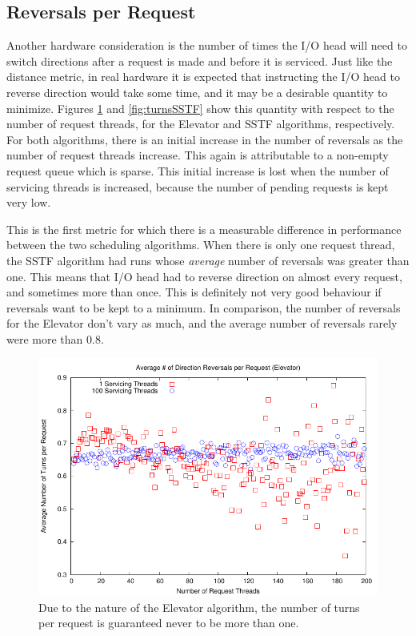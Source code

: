 \documentclass[12pt]{report}
\begin{document}
\subsection{Reversals per Request}
Another hardware consideration is the number of times the I/O head will need to switch
directions after a request is made and before it is serviced. Just like the distance
metric, in real hardware it is expected that instructing the I/O head to reverse direction
would take some time, and it may be a desirable quantity to minimize. Figures
\ref{fig:turnsElevator} and \ref{fig:turnsSSTF} show this quantity with respect to the 
number of request threads, for the Elevator and SSTF algorithms, respectively.
For both algorithms, there is an initial increase in the number of reversals as the number
of request threads increase. This again is attributable to a non-empty request queue which
is sparse. This initial increase is lost when the number of servicing threads is
increased, because the number of pending requests is kept very low.

This is the first metric for which there is a measurable difference in performance between
the two scheduling algorithms. When
there is only one request thread, the SSTF algorithm had runs whose \emph{average} number
of reversals was greater than one. This means that I/O head had to reverse direction on
almost every request, and sometimes more than once. This is definitely not very good
behaviour if reversals want to be kept to a minimum. In comparison, the number of reversals
for the Elevator don't vary as much, and the average number of reversals rarely were more
than 0.8.
\newpage
\begin{figure}[htb]
    \centering
    \includegraphics[scale=1]{turnsElevator.pdf}
    \caption{Due to the nature of the Elevator algorithm, the number of turns per request
    is guaranteed never to be more than one.}
    \label{fig:turnsElevator}
\end{figure}
\end{document}
